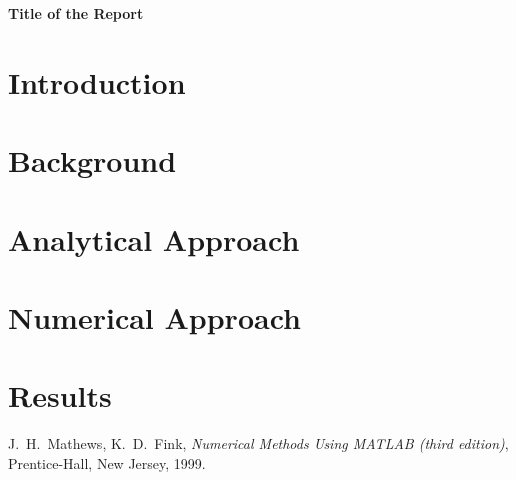 \documentclass[11pt]{article}
\begin{document}
\centerline{\textbf{\Large Title of the Report}}

\section{Introduction}

\section{Background}

\section{Analytical Approach}

\section{Numerical Approach}

\section{Results}
\label{sec:RESULTS}

\begin{thebibliography}{99}
 J.~H.~Mathews, K.~D.~Fink, \emph{Numerical Methods Using MATLAB (third edition)},
                  Prentice-Hall, New Jersey, 1999.
\end{thebibliography}
\end{document}
